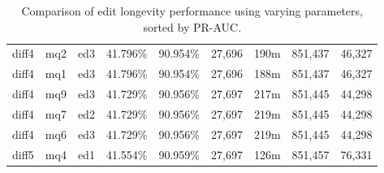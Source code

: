\begin{sidewaystable}[!ph]
\begin{center}
\begin{tabular}{|c|c|c||c|c||c|c|c|c|}
diff4 & mq2 & ed3 & 41.796\% & 90.954\% & 27,696 & 190m & 851,437 & 46,327 \\
diff4 & mq1 & ed3 & 41.796\% & 90.954\% & 27,696 & 188m & 851,437 & 46,327 \\
diff4 & mq9 & ed3 & 41.729\% & 90.956\% & 27,697 & 217m & 851,445 & 44,298 \\
diff4 & mq7 & ed2 & 41.729\% & 90.956\% & 27,697 & 219m & 851,445 & 44,298 \\
diff4 & mq6 & ed3 & 41.729\% & 90.956\% & 27,697 & 219m & 851,445 & 44,298 \\
diff5 & mq4 & ed1 & 41.554\% & 90.959\% & 27,697 & 126m & 851,457 & 76,331 \\
\hline
\end{tabular}
\end{center}
\caption{Comparison of edit longevity performance using
    varying parameters, sorted by PR-AUC.}
\label{tab:editshoutE}
\end{sidewaystable}
\clearpage
